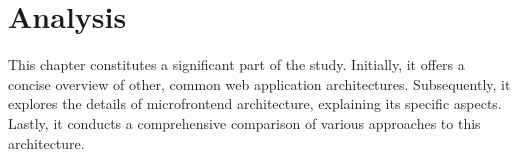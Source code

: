 \chapter{Analysis}
\label{chap:Analysis} 
This chapter constitutes a significant part of the study. Initially, it offers a concise overview of other, common web application architectures. Subsequently, it explores the details of microfrontend architecture, explaining its specific aspects. Lastly, it conducts a comprehensive comparison of various approaches to this architecture.



